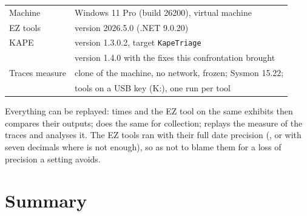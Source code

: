 \documentclass[11pt,a4paper,oneside]{report}
\begin{document}
\begin{tabular}{@{}ll@{}}
Machine & Windows 11 Pro (build 26200), virtual machine \\
EZ tools & version 2026.5.0 (.NET 9.0.20) \\
KAPE & version 1.3.0.2, target \texttt{KapeTriage} \\
\wac{} & version 1.4.0 with the fixes this confrontation brought \\
Traces measure & clone of the machine, no network, frozen; Sysmon 15.22; \\
               & tools on a USB key (K:), one run per tool \\
\end{tabular}

Everything can be replayed:  times
\wac{} and the EZ tool on the same exhibits then compares their outputs;
 does the same for collection;
 replays the measure of the traces
and  analyses it. The EZ tools ran
with their full date precision (, or  with seven decimals where
 is not enough), so as not to blame them for a loss of precision a
setting avoids.

\chapter{Summary}
\end{document}
